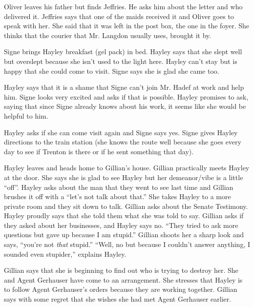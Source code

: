 Oliver leaves his father but finds Jeffries.  He asks him about the letter and who delivered it.  Jeffries says that one of the maids received it and Oliver goes to speak with her.  She said that it was left in the post box, the one in the foyer.  She thinks that the courier that Mr. Langdon usually uses, brought it by.



Signe brings Hayley breakfast (gel pack) in bed.  Hayley says that she slept well but overslept because she isn't used to the light here.  Hayley can't stay but is happy that she could come to visit.  Signe says she is glad she came too.  



Hayley says that it is a shame that Signe can't join Mr. Hadef at work and help him.  Signe looks very excited and asks if that is possible.  Hayley promises to ask, saying that since Signe already knows about his work, it seems like she would be helpful to him.  



Hayley asks if she can come visit again and Signe says yes.  Signe gives Hayley directions to the train station (she knows the route well because she goes every day to see if Trenton is there or if he sent something that day).  



Hayley leaves and heads home to Gillian's house.  Gillian practically meets Hayley at the door.  She says she is glad to see Hayley but her demeanor/vibe is a little ``off''.  Hayley asks about the man that they went to see last time and Gillian brushes it off with a ``let's not talk about that.''  She takes Hayley to a more private room and they sit down to talk.  Gillian asks about the Senate Testimony.  Hayley proudly says that she told them what she was told to say.  Gillian asks if they asked about her businesses, and Hayley says no.  ``They tried to ask more questions but gave up because I am stupid.''  Gillian shoots her a sharp look and says, ``you're not \textit{that }stupid.'' ``Well, no but because I couldn't answer anything, I sounded even stupider,'' explains Hayley.



Gillian says that she is beginning to find out who is trying to destroy her.  She and Agent Gerhauser have come to an arrangement.  She stresses that Hayley is to follow Agent Gerhauser's orders because they are working together.  Gillian says with some regret that she wishes she had met Agent Gerhauser earlier.



